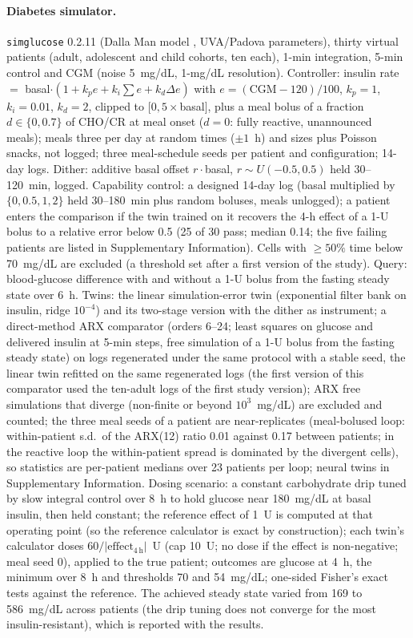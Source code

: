 \documentclass[11pt]{article}
\begin{document}
\paragraph{Diabetes simulator.} \texttt{simglucose} 0.2.11 \citep{simglucose} (Dalla Man model \citep{dallaman2007}, UVA/Padova parameters), thirty virtual patients (adult, adolescent and child cohorts, ten each), 1-min integration, 5-min control and CGM (noise 5~mg/dL, 1-mg/dL resolution). Controller: insulin rate $=$ basal$\cdot(1+k_p e+k_i\sum e+k_d\Delta e)$ with $e=(\mathrm{CGM}-120)/100$, $k_p=1$, $k_i=0.01$, $k_d=2$, clipped to $[0,5\times$basal$]$, plus a meal bolus of a fraction $d\in\{0,0.7\}$ of CHO/CR at meal onset ($d=0$: fully reactive, unannounced meals); meals three per day at random times ($\pm1$~h) and sizes plus Poisson snacks, not logged; three meal-schedule seeds per patient and configuration; 14-day logs. Dither: additive basal offset $r\cdot$basal, $r\sim U(-0.5,0.5)$ held 30--120~min, logged. Capability control: a designed 14-day log (basal multiplied by $\{0,0.5,1,2\}$ held 30--180~min plus random boluses, meals unlogged); a patient enters the comparison if the twin trained on it recovers the 4-h effect of a 1-U bolus to a relative error below 0.5 (25 of 30 pass; median 0.14; the five failing patients are listed in Supplementary Information). Cells with $\ge50\%$ time below 70~mg/dL are excluded (a threshold set after a first version of the study). Query: blood-glucose difference with and without a 1-U bolus from the fasting steady state over 6~h. Twins: the linear simulation-error twin (exponential filter bank on insulin, ridge $10^{-4}$) and its two-stage version with the dither as instrument; a direct-method ARX comparator (orders 6--24; least squares on glucose and delivered insulin at 5-min steps, free simulation of a 1-U bolus from the fasting steady state) on logs regenerated under the same protocol with a stable seed, the linear twin refitted on the same regenerated logs (the first version of this comparator used the ten-adult logs of the first study version); ARX free simulations that diverge (non-finite or beyond $10^3$~mg/dL) are excluded and counted; the three meal seeds of a patient are near-replicates (meal-bolused loop: within-patient s.d.\ of the ARX(12) ratio 0.01 against 0.17 between patients; in the reactive loop the within-patient spread is dominated by the divergent cells), so statistics are per-patient medians over 23 patients per loop; neural twins in Supplementary Information. Dosing scenario: a constant carbohydrate drip tuned by slow integral control over 8~h to hold glucose near 180~mg/dL at basal insulin, then held constant; the reference effect of 1~U is computed at that operating point (so the reference calculator is exact by construction); each twin's calculator doses $60/|\text{effect}_{4\,\mathrm h}|$~U (cap 10~U; no dose if the effect is non-negative; meal seed 0), applied to the true patient; outcomes are glucose at 4~h, the minimum over 8~h and thresholds 70 and 54~mg/dL; one-sided Fisher's exact tests against the reference. The achieved steady state varied from 169 to 586~mg/dL across patients (the drip tuning does not converge for the most insulin-resistant), which is reported with the results.
\end{document}
